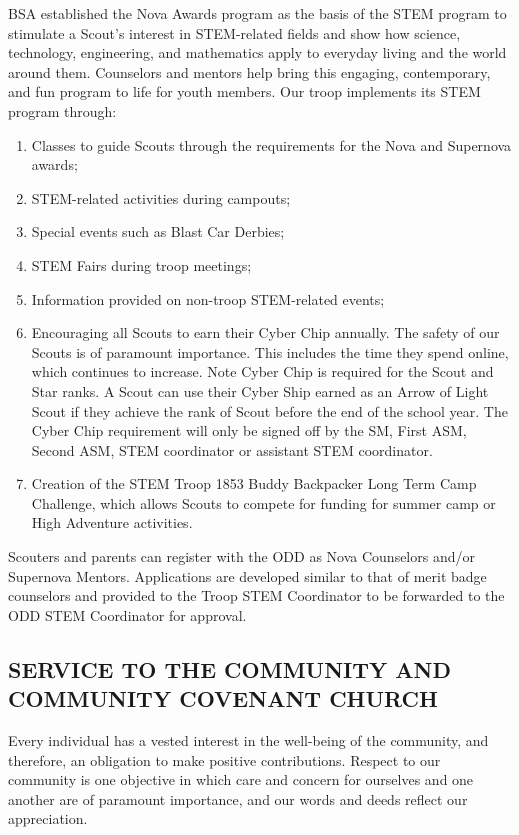 \documentclass{ltxguide}
\begin{document}
\ac{BSA} established the Nova Awards program as the basis of the STEM program to stimulate a Scout's interest in STEM-related fields and show how science, technology, engineering, and mathematics apply to everyday living and the world around them. Counselors and mentors help bring this engaging, contemporary, and fun program to life for youth members. Our troop implements its STEM program through:

\begin{enumerate}
	\item Classes to guide Scouts through the requirements for the Nova and Supernova awards;
	\item STEM-related activities during campouts;
	\item Special events such as Blast Car Derbies;
	\item STEM Fairs during troop meetings;
	\item Information provided on non-troop STEM-related events;
	\item Encouraging all Scouts to earn their Cyber Chip annually. The safety of our Scouts is of paramount importance. This includes the time they spend online, which continues to increase. Note Cyber Chip is required for the Scout and Star ranks. A Scout can use their Cyber Ship earned as an Arrow of Light Scout if they achieve the rank of Scout before the end of the school year. The Cyber Chip requirement will only be signed off by the SM, First \ac{ASM}, Second \ac{ASM}, STEM coordinator or assistant STEM coordinator.
	\item Creation of the STEM Troop 1853 Buddy Backpacker Long Term Camp Challenge, which allows Scouts to compete for funding for summer camp or High Adventure activities.
\end{enumerate}

Scouters and parents can register with the \ac{ODD} as Nova Counselors and/or Supernova Mentors. Applications are developed similar to that of merit badge counselors and provided to the Troop STEM Coordinator to be forwarded to the \ac{ODD} STEM Coordinator for approval.

\subsection{SERVICE TO THE COMMUNITY AND COMMUNITY COVENANT CHURCH}
Every individual has a vested interest in the well-being of the community, and therefore, an obligation to make positive contributions. Respect to our community is one objective in which care and concern for ourselves and one another are of paramount importance, and our words and deeds reflect our appreciation.
\end{document}

